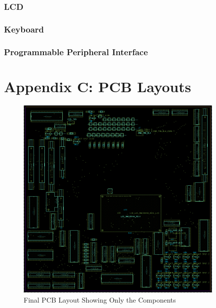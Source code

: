            \subsubsection{LCD} \label{sec:lcd_asm}

            \newpage
            \subsubsection{Keyboard} \label{sec:keybrd_asm}

            \newpage
            \subsubsection{Programmable Peripheral Interface} \label{sec:ppi_asm}


    \clearpage
    \newpage

    \section{Appendix C: PCB Layouts} \label{appendix:pcb}

        \begin{figure}[ht]
            \begin{center}
                \includegraphics[width=0.9\textwidth]{figures/main.png}
                \caption{Final PCB Layout Showing Only the Components} \label{fig:main}
            \end{center}
        \end{figure}


